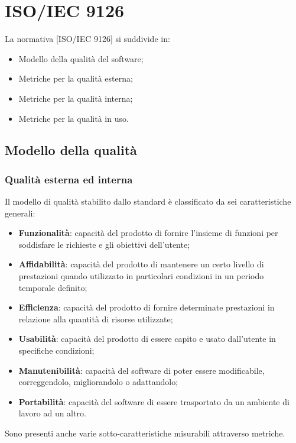\documentclass[../PianoDiQualifica.tex]{subfiles}
\begin{document}
	\section{ISO/IEC 9126}\label{app:ISO9126}
		La normativa [ISO/IEC 9126] si suddivide in:
		\begin{itemize}
			\item Modello della qualità del software;
			\item Metriche per la qualità esterna;
			\item Metriche per la qualità interna;
			\item Metriche per la qualità in uso.
		\end{itemize}
		\subsection{Modello della qualità}
			\subsubsection{Qualità esterna ed interna}
				Il modello di qualità stabilito dallo standard è classificato da sei caratteristiche
				generali:
				\begin{itemize}
					\item \textbf{Funzionalità}: capacità del prodotto di fornire l'insieme di funzioni
					per soddisfare le richieste e gli obiettivi dell'utente;
					\item \textbf{Affidabilità}: capacità del prodotto di mantenere un certo livello di
					prestazioni quando utilizzato in particolari condizioni in un periodo temporale
					definito;
					\item \textbf{Efficienza}: capacità del prodotto di fornire determinate prestazioni
					in relazione alla quantità di risorse utilizzate;
					\item \textbf{Usabilità}: capacità del prodotto di essere capito e usato
					dall'utente	in specifiche condizioni;
					\item \textbf{Manutenibilità}: capacità del software di poter essere modificabile,
					correggendolo, migliorandolo o adattandolo;
					\item \textbf{Portabilità}: capacità del software di essere trasportato da un
					ambiente di lavoro ad un altro.
				\end{itemize}
				Sono presenti anche varie sotto-caratteristiche misurabili attraverso metriche.
\end{document}
